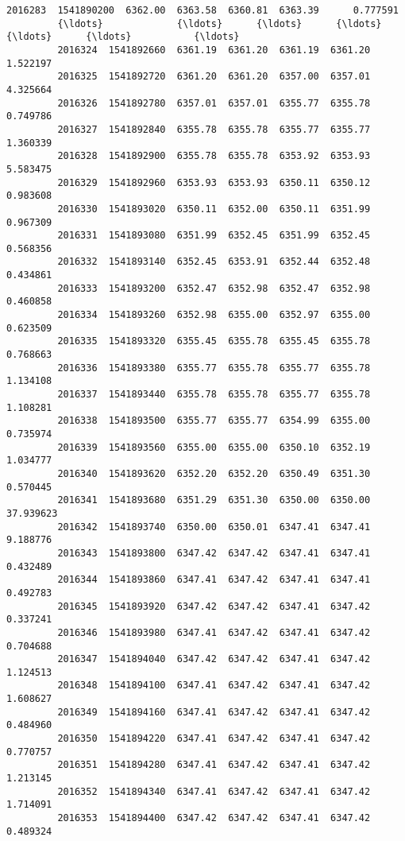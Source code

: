 \documentclass[11pt]{article}
\begin{document}
\begin{Verbatim}[commandchars=\\\{\}]
         2016283  1541890200  6362.00  6363.58  6360.81  6363.39      0.777591   
         {\ldots}             {\ldots}      {\ldots}      {\ldots}      {\ldots}      {\ldots}           {\ldots}   
         2016324  1541892660  6361.19  6361.20  6361.19  6361.20      1.522197   
         2016325  1541892720  6361.20  6361.20  6357.00  6357.01      4.325664   
         2016326  1541892780  6357.01  6357.01  6355.77  6355.78      0.749786   
         2016327  1541892840  6355.78  6355.78  6355.77  6355.77      1.360339   
         2016328  1541892900  6355.78  6355.78  6353.92  6353.93      5.583475   
         2016329  1541892960  6353.93  6353.93  6350.11  6350.12      0.983608   
         2016330  1541893020  6350.11  6352.00  6350.11  6351.99      0.967309   
         2016331  1541893080  6351.99  6352.45  6351.99  6352.45      0.568356   
         2016332  1541893140  6352.45  6353.91  6352.44  6352.48      0.434861   
         2016333  1541893200  6352.47  6352.98  6352.47  6352.98      0.460858   
         2016334  1541893260  6352.98  6355.00  6352.97  6355.00      0.623509   
         2016335  1541893320  6355.45  6355.78  6355.45  6355.78      0.768663   
         2016336  1541893380  6355.77  6355.78  6355.77  6355.78      1.134108   
         2016337  1541893440  6355.78  6355.78  6355.77  6355.78      1.108281   
         2016338  1541893500  6355.77  6355.77  6354.99  6355.00      0.735974   
         2016339  1541893560  6355.00  6355.00  6350.10  6352.19      1.034777   
         2016340  1541893620  6352.20  6352.20  6350.49  6351.30      0.570445   
         2016341  1541893680  6351.29  6351.30  6350.00  6350.00     37.939623   
         2016342  1541893740  6350.00  6350.01  6347.41  6347.41      9.188776   
         2016343  1541893800  6347.42  6347.42  6347.41  6347.41      0.432489   
         2016344  1541893860  6347.41  6347.42  6347.41  6347.41      0.492783   
         2016345  1541893920  6347.42  6347.42  6347.41  6347.42      0.337241   
         2016346  1541893980  6347.41  6347.42  6347.41  6347.42      0.704688   
         2016347  1541894040  6347.42  6347.42  6347.41  6347.42      1.124513   
         2016348  1541894100  6347.41  6347.42  6347.41  6347.42      1.608627   
         2016349  1541894160  6347.41  6347.42  6347.41  6347.42      0.484960   
         2016350  1541894220  6347.41  6347.42  6347.41  6347.42      0.770757   
         2016351  1541894280  6347.41  6347.42  6347.41  6347.42      1.213145   
         2016352  1541894340  6347.41  6347.42  6347.41  6347.42      1.714091   
         2016353  1541894400  6347.42  6347.42  6347.41  6347.42      0.489324   
         

\end{Verbatim}
\end{document}
